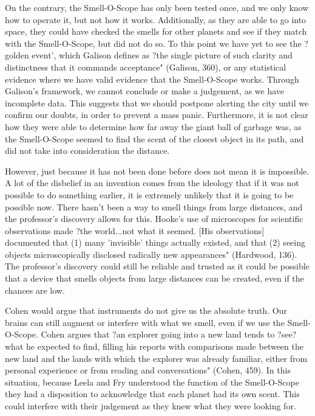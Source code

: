\documentclass[11pt, oneside]{article}
\begin{document}
\par On the contrary, the Smell-O-Scope has only been tested once, and we only know how to operate it, but not how it works. Additionally, as they are able to go into space, they could have checked the smells for other planets and see if they match with the Smell-O-Scope, but did not do so. To this point we have yet to see the ?golden event', which Galison defines as ?the single picture of such clarity and distinctness that it commands acceptance" (Galison, 360), or any statistical evidence where we have valid evidence that the Smell-O-Scope works. Through Galison's framework, we cannot conclude or make a judgement, as we have incomplete data. This suggests that we should postpone alerting the city until we confirm our doubts, in order to prevent a mass panic. Furthermore, it is not clear how they were able to determine how far away the giant ball of garbage was, as the Smell-O-Scope seemed to find the scent of the closest object in its path, and did not take into consideration the distance.

\par However, just because it has not been done before does not mean it is impossible. A lot of the disbelief in an invention comes from the ideology that if it was not possible to do something earlier, it is extremely unlikely that it is going to be possible now. There hasn't been a way to smell things from large distances, and the professor's discovery allows for this. Hooke's use of microscopes for scientific observations made ?the world...not what it seemed. [His observations] documented that (1) many 'invisible' things actually existed, and that (2) seeing objects microscopically disclosed radically new appearances" (Hardwood, 136). The professor's discovery could still be reliable and trusted as it could be possible that a device that smells objects from large distances can be created, even if the chances are low. 

\par Cohen would argue that instruments do not give us the absolute truth. Our brains can still augment or interfere with what we smell, even if we use the Smell-O-Scope. Cohen argues that ?an explorer going into a new land tends to ?see? what he expected to find, filling his reports with comparisons made between the new land and the lands with which the explorer was already familiar, either from personal experience or from reading and conversations" (Cohen, 459). In this situation, because Leela and Fry understood the function of the Smell-O-Scope they had a disposition to acknowledge that each planet had its own scent. This could interfere with their judgement as they knew what they were looking for. 
\end{document}

